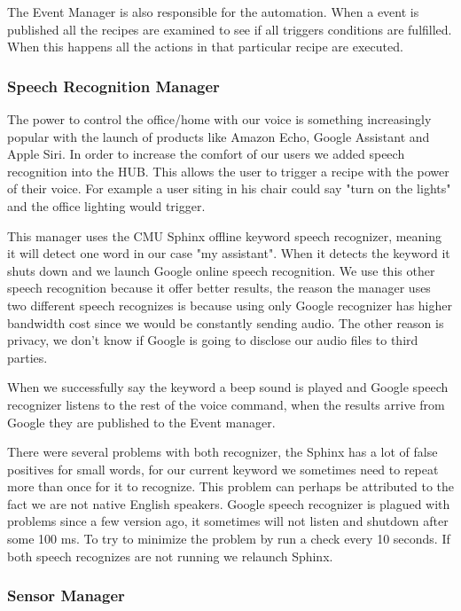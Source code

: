 The Event Manager is also responsible for the automation. When a event is published all the recipes are examined to see if all triggers conditions are fulfilled. When this happens all the actions in that particular recipe are executed.


\subsubsection{Speech Recognition Manager}

The power to control the office/home with our voice is something increasingly popular with the launch of products like Amazon Echo, Google Assistant and Apple Siri. In order to increase the comfort of our users we added speech recognition into the HUB. This allows the user to trigger a recipe with the power of their voice. For example a user siting in his chair could say "turn on the lights" and the office lighting would trigger. 

This manager uses the CMU Sphinx offline keyword speech recognizer, meaning it will detect one word in our case "my assistant". When it detects the keyword it shuts down and we launch Google online speech recognition. We use this other speech recognition because it offer better results, the reason the manager uses two different speech recognizes is because using only Google recognizer has higher bandwidth cost since we would be constantly sending audio. The other reason is privacy, we don't know if Google is going to disclose our audio files to third parties.

When we successfully say the keyword a beep sound is played and Google speech recognizer listens to the rest of the voice command, when the results arrive from Google they are published to the Event manager.

There were several problems with both recognizer, the Sphinx has a lot of false positives for small words, for our current keyword we sometimes need to repeat more than once for it to recognize. This problem can perhaps be attributed to the fact we are not native English speakers. 
Google speech recognizer is plagued with problems since a few version ago, it sometimes will not listen and shutdown after some 100 ms. To try to minimize the problem by run a check every 10 seconds. If both speech recognizes are not running we relaunch Sphinx.

\subsubsection{Sensor Manager}\label{sensor_manager_imp}

